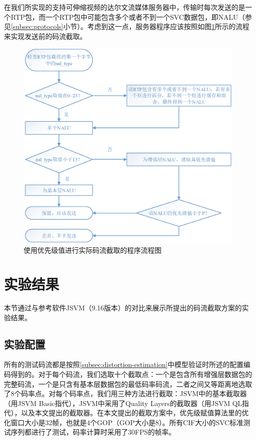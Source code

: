 在我们所实现的支持可伸缩视频的达尔文流媒体服务器中，传输时每次发送的是一个RTP包，而一个RTP包中可能包含多个或者不到一个SVC数据包，即NALU（参见\ref{subsec:protocols}小节）。考虑到这一点，服务器程序应该按照如图\ref{fig:extraction-flow}所示的流程来实现发送前的码流截取。

\begin{figure}[!ht]
	\centering
	\vspace{10pt}
	\includegraphics[width = 1.0\linewidth]{eps/extraction-flow}
	\caption{使用优先级值进行实际码流截取的程序流程图\label{fig:extraction-flow}}
	\vspace{10pt}
\end{figure}

\section{实验结果}

本节通过与参考软件JSVM（9.16版本）的对比来展示所提出的码流截取方案的实验结果。

\subsection{实验配置}

所有的测试码流都是按照\ref{subsec:distortion-estimation}中模型验证时所述的配置编码得到的。对于每个码流，我们选取十个截取点：一个是包含所有增强层数据包的完整码流，一个是只含有基本层数据包的最低码率码流，二者之间又等距离地选取了8个码率点。对每个码率点，我们用三种方法进行截取：JSVM中的基本截取器（用JSVM Basic指代），JSVM中采用了Quality Layers的截取器（用JSVM QL指代），以及本文提出的截取器。在本文提出的截取方案中，优先级赋值算法里的优化窗口大小是32帧，也就是4个GOP（GOP大小是8）。所有CIF大小的SVC标准测试序列都进行了测试，码率计算时采用了30FPS的帧率。

